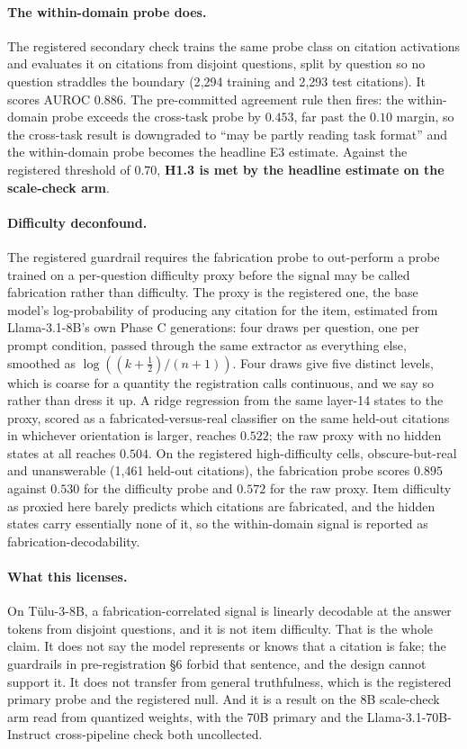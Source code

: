 \paragraph{The within-domain probe does.}
The registered secondary check trains the same probe class on citation
activations and evaluates it on citations from disjoint questions, split by
question so no question straddles the boundary (2{,}294 training and 2{,}293
test citations). It scores AUROC $0.886$. The pre-committed agreement rule then
fires: the within-domain probe exceeds the cross-task probe by $0.453$, far past
the $0.10$ margin, so the cross-task result is downgraded to ``may be partly
reading task format'' and the within-domain probe becomes the headline E3
estimate. Against the registered threshold of $0.70$, \textbf{H1.3 is met by the
headline estimate on the scale-check arm}.

\paragraph{Difficulty deconfound.}
The registered guardrail requires the fabrication probe to out-perform a probe
trained on a per-question difficulty proxy before the signal may be called
fabrication rather than difficulty. The proxy is the registered one, the base
model's log-probability of producing any citation for the item, estimated from
Llama-3.1-8B's own Phase C generations: four draws per question, one per prompt
condition, passed through the same extractor as everything else, smoothed as
$\log((k + \tfrac12)/(n + 1))$. Four draws give five distinct levels, which is
coarse for a quantity the registration calls continuous, and we say so rather
than dress it up. A ridge regression from the same layer-14 states to the proxy,
scored as a fabricated-versus-real classifier on the same held-out citations in
whichever orientation is larger, reaches $0.522$; the raw proxy with no hidden
states at all reaches $0.504$. On the registered high-difficulty cells,
obscure-but-real and unanswerable (1{,}461 held-out citations), the fabrication
probe scores $0.895$ against $0.530$ for the difficulty probe and $0.572$ for the
raw proxy. Item difficulty as proxied here barely predicts which citations are
fabricated, and the hidden states carry essentially none of it, so the
within-domain signal is reported as fabrication-decodability.

\paragraph{What this licenses.}
On Tülu-3-8B, a fabrication-correlated signal is linearly decodable at the
answer tokens from disjoint questions, and it is not item difficulty. That is
the whole claim. It does not say the model represents or knows that a citation
is fake; the guardrails in pre-registration §6 forbid that sentence, and the
design cannot support it. It does not transfer from general truthfulness, which
is the registered primary probe and the registered null. And it is a result on
the 8B scale-check arm read from quantized weights, with the 70B primary and the
Llama-3.1-70B-Instruct cross-pipeline check both uncollected.

